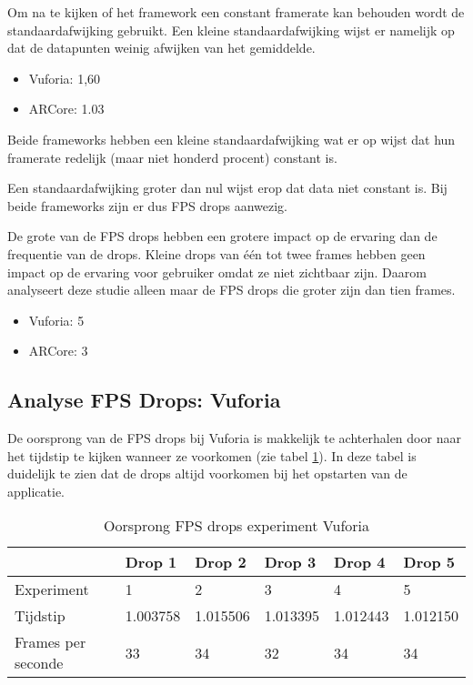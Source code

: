 Om na te kijken of het framework een constant framerate kan behouden wordt de standaardafwijking gebruikt. Een kleine standaardafwijking wijst er namelijk op dat de datapunten weinig afwijken van het gemiddelde.

\begin{itemize}
    \item Vuforia: 1,60
    \item ARCore: 1.03
\end{itemize}

Beide frameworks hebben een kleine standaardafwijking wat er op wijst dat hun framerate redelijk (maar niet honderd procent) constant is. 

Een standaardafwijking groter dan nul wijst erop dat data niet constant is. Bij beide frameworks zijn er dus FPS drops aanwezig.

De grote van de FPS drops hebben een grotere impact op de ervaring dan de frequentie van de drops. Kleine drops van één tot twee frames hebben geen impact op de ervaring voor gebruiker omdat ze niet zichtbaar zijn. Daarom analyseert deze studie alleen maar de FPS drops die groter zijn dan tien frames.

\begin{itemize}
    \item Vuforia: 5
    \item ARCore: 3
\end{itemize}

\subsection{Analyse FPS Drops: Vuforia}

De oorsprong van de FPS drops bij Vuforia is makkelijk te achterhalen door naar het tijdstip te kijken wanneer ze voorkomen (zie tabel \ref{tbl:vuforiadrop}). In deze tabel is duidelijk te zien dat de drops altijd voorkomen bij het opstarten van de applicatie.

\begin{table}[]
    \begin{tabular}{@{}l|l|l|l|l|l@{}}
        & Drop 1   & Drop 2   & Drop 3   & Drop 4   & Drop 5   \\ \midrule
        Experiment         & 1        & 2        & 3        & 4        & 5        \\
        Tijdstip           & 1.003758 & 1.015506 & 1.013395 & 1.012443 & 1.012150 \\
        Frames per seconde & 33       & 34       & 32       & 34       & 34      
    \end{tabular}
    \caption{Oorsprong FPS drops experiment Vuforia}\label{tbl:vuforiadrop}
\end{table}

